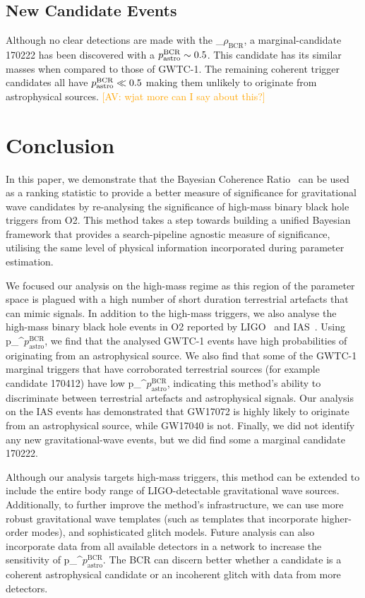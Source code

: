 \documentclass[%
 nofootinbib,
 amsmath,amssymb,
 aps,
 twocolumn
]{revtex4-2}
\newcommand{\fancytext}[1]{{\relax\ifmmode#1\else $#1$\fi}\xspace}
\newcommand{\mathcmd}[1]{{\sc \relax\ifmmode#1\else $#1$\fi}\xspace}
\newcommand{\bcr}{\mathcmd{\rho_\text{BCR}}}
\newcommand{\pastrobcr}{\fancytext{p_\text{astro}^{\text{BCR}}}}
\newcommand{\avi}[1]{\textcolor{orange}{[AV: #1]}}
\begin{document}
\subsection{New Candidate Events}
Although no clear detections are made with the \bcr, a marginal-candidate 170222 has been discovered with a $\pastrobcr\sim0.5$. This candidate has its similar masses when compared to those of GWTC-1. The remaining coherent trigger candidates all have $\pastrobcr\ll0.5$ making them unlikely to originate from astrophysical sources. \avi{wjat more can I say about this?}


\section{\label{sec:Conclusion}Conclusion}

In this paper, we demonstrate that the Bayesian Coherence Ratio~\cite{BCR1} can be used as a ranking statistic to provide a better measure of significance for gravitational wave candidates by re-analysing the significance of high-mass binary black hole triggers from O2. This method takes a step towards building a unified Bayesian framework that provides a search-pipeline agnostic measure of significance, utilising the same level of physical information incorporated during parameter estimation. 

We focused our analysis on the high-mass regime as this region of the parameter space is plagued with a high number of short duration terrestrial artefacts that can mimic signals. In addition to the high-mass triggers, we also analyse the high-mass binary black hole events in O2 reported by LIGO~\cite{GWTC1} and IAS~\cite{IAS1, IAS2}. Using \pastrobcr, we find that the analysed GWTC-1 events have high probabilities of originating from an astrophysical source. We also find that some of the GWTC-1 marginal triggers that have corroborated terrestrial sources (for example candidate 170412) have low \pastrobcr, indicating this method's ability to discriminate between terrestrial artefacts and astrophysical signals. Our analysis on the IAS events has demonstrated that GW17072 is highly likely to originate from an astrophysical source, while GW17040 is not. Finally, we did not identify any new gravitational-wave events, but we did find some a marginal candidate 170222. 

Although our analysis targets high-mass triggers, this method can be extended to include the entire body range of LIGO-detectable gravitational wave sources. Additionally, to further improve the method's infrastructure, we can use more robust gravitational wave templates (such as templates that incorporate higher-order modes), and sophisticated glitch models. Future analysis can also incorporate data from all available detectors in a network to increase the sensitivity of \pastrobcr. The BCR can discern better whether a candidate is a coherent astrophysical candidate or an incoherent glitch with data from more detectors. 
\end{document}
